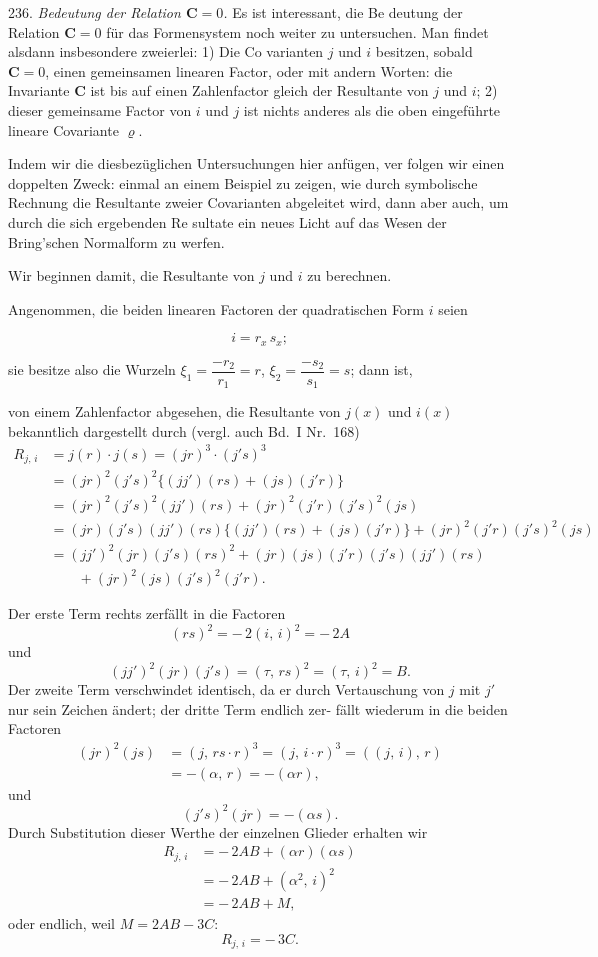 \documentclass[11pt]{article}
\providecommand{\weberpage}[1]{}
\providecommand{\weq}[2]{\begin{equation}\tag{#1}#2\end{equation}}
\begin{document}
236. \textit{Bedeutung der Relation $\mathbf{C} = 0$.} Es ist interessant, die Be\-
deutung der Relation $\mathbf{C} = 0$ für das Formensystem noch weiter zu
untersuchen. Man findet alsdann insbesondere zweierlei: 1) Die Co\-
varianten $j$ und $i$ besitzen, sobald $\mathbf{C} = 0$, einen gemeinsamen linearen
Factor, oder mit andern Worten: die Invariante $\mathbf{C}$ ist bis auf einen
Zahlenfactor gleich der Resultante von $j$ und $i$; 2) dieser gemeinsame
Factor von $i$ und $j$ ist nichts anderes als die oben eingeführte lineare
Covariante $\varrho$.

Indem wir die diesbezüglichen Untersuchungen hier anfügen, ver\-
folgen wir einen doppelten Zweck: einmal an einem Beispiel zu zeigen,
wie durch symbolische Rechnung die Resultante zweier Covarianten
abgeleitet wird, dann aber auch, um durch die sich ergebenden Re\-
sultate ein neues Licht auf das Wesen der Bring'schen Normalform
zu werfen.

Wir beginnen damit, die Resultante von $j$ und $i$ zu berechnen.

Angenommen, die beiden linearen Factoren der quadratischen
Form $i$ seien

\[
i = r_x\,s_x;
\]

sie besitze also die Wurzeln $\xi_1 = \dfrac{-r_2}{r_1} = r$, $\xi_2 = \dfrac{-s_2}{s_1} = s$; dann ist,


\weberpage{261}
von einem Zahlenfactor abgesehen, die Resultante von $j(x)$ und $i(x)$
bekanntlich dargestellt durch (vergl. auch Bd.\ I Nr.\ 168)
\[
\begin{aligned}
R_{j,\,i} &= j(r)\cdot j(s) = (jr)^3\cdot(j's)^3 \\
&= (jr)^2(j's)^2\{(jj')(rs)+(js)(j'r)\} \\
&= (jr)^2(j's)^2(jj')(rs)+(jr)^2(j'r)(j's)^2(js) \\
&= (jr)(j's)(jj')(rs)\{(jj')(rs)+(js)(j'r)\}+(jr)^2(j'r)(j's)^2(js) \\
&= (jj')^2(jr)(j's)(rs)^2+(jr)(js)(j'r)(j's)(jj')(rs) \\
&\qquad {}+(jr)^2(js)(j's)^2(j'r).
\end{aligned}
\]

Der erste Term rechts zerf\"allt in die Factoren
\[
(rs)^2 = -\,2(i,\,i)^2 = -\,2A
\]
und
\[
(jj')^2(jr)(j's) = (\tau,\,rs)^2 = (\tau,\,i)^2 = B.
\]
Der zweite Term verschwindet identisch, da er durch Vertauschung
von $j$ mit $j'$ nur sein Zeichen \"andert; der dritte Term endlich zer-
f\"allt wiederum in die beiden Factoren
\[
\begin{aligned}
(jr)^2(js) &= (j,\,rs\cdot r)^3 = (j,\,i\cdot r)^3 = ((j,\,i),\,r) \\
&= -(\alpha,\,r) = -(\alpha r),
\end{aligned}
\]
und
\[
(j's)^2(jr) = -(\alpha s).
\]
Durch Substitution dieser Werthe der einzelnen Glieder erhalten wir
\[
\begin{aligned}
R_{j,\,i} &= -\,2AB+(\alpha r)(\alpha s) \\
&= -\,2AB+(\alpha^2,\,i)^2 \\
&= -\,2AB+M,
\end{aligned}
\]
oder endlich, weil $M=2AB-3C$:
\weq{1}{R_{j,\,i} = -\,3C.}
\end{document}

